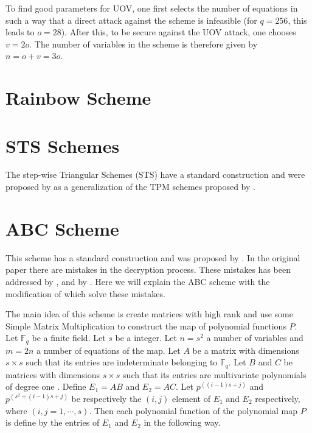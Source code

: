To find good parameters for UOV, one first selects the number of equations in such a way that a direct attack against the scheme is infeasible (for $q=256$, this leads to $o = 28$). After this, to be secure against the UOV attack, one chooses $v=2o$. The number of variables in the scheme is therefore given by $n=o+v=3o$.
\section{Rainbow Scheme}
\section{STS Schemes}
The step-wise Triangular Schemes (STS) have a standard construction and were proposed by \cite{Wolf2005} as a generalization of the TPM schemes proposed by  \cite{Goubin:2000:CTC:647096.716863}.

\section{ABC Scheme}
This scheme has a standard construction and was proposed by \citet{Tao2013}. In the original paper there are mistakes in the decryption process. These mistakes has been addressed by \citet{Ding2014},  \citet{Tao2015} and by \citet{Petzoldt2016}. Here we will explain the ABC scheme with the modification of \citet{Petzoldt2016} which solve these mistakes. 

The main idea of this scheme is create matrices with high rank and use some Simple Matrix Multiplication to construct the map of polynomial functions $P$. Let $\mathbb{F}_q$ be a finite field. Let $s$ be a integer. Let $n=s^2$ a number of variables and $m=2n$ a number of equations of the map. Let $A$ be a matrix with dimensions $s\times s$ such that its entries are indeterminate belonging to $\mathbb{F}_q$. Let $B$ and $C$ be matrices with dimensions $s\times s$ such that its entries are multivariate polynomials of degree one . Define $E_1 = AB$ and $E_2 = AC$. Let $p^{({(i-1)}s+j)}$ and $p^{({s^2+(i-1)s+j})}$ be respectively the $(i,j)$ element of $E_1$ and $E_2$ respectively, where $(i,j=1,\cdots,s)$. Then each polynomial function of the polynomial map $P$ is define by the entries of $E_1$ and $E_2$ in the following way.

